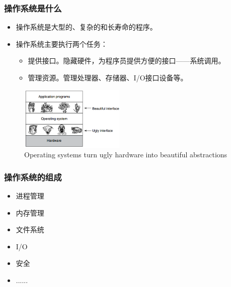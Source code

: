 \documentclass{beamer}
\begin{document}
\begin{frame}
    \frametitle{操作系统是什么}
    \begin{itemize}
        \item 操作系统是大型的、复杂的和长寿命的程序。
        \item 操作系统主要执行两个任务：
        \begin{itemize}
            \item 提供接口。隐藏硬件，为程序员提供方便的接口——系统调用。
            \item 管理资源。管理处理器、存储器、I/O接口设备等。
        \end{itemize}
    \end{itemize}

    \begin{figure}[htbp]
    \centering
    \begin{minipage}[t]{0.48\textwidth}
    \centering
    \includegraphics[width=5cm]{images/os_interface.png}
    \caption{Operating systems turn ugly hardware into beautiful abstractions}
    \end{minipage}
    \end{figure}
\end{frame}

\begin{frame}
    \frametitle{操作系统的组成}
    \begin{itemize}
        \item 进程管理
        \item 内存管理
        \item 文件系统
        \item I/O
        \item 安全
        \item ......
    \end{itemize}
\end{frame}
\end{document}
